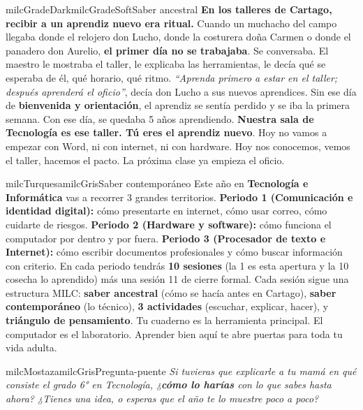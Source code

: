\documentclass[11pt,letterpaper]{article}
\begin{document}
\begin{softbox}{milcGradeDark}{milcGradeSoft}{Saber ancestral}
\textbf{En los talleres de Cartago, recibir a un aprendiz nuevo era ritual.} Cuando un muchacho del campo llegaba donde el relojero don Lucho, donde la costurera doña Carmen o donde el panadero don Aurelio, \textbf{el primer día no se trabajaba}. Se conversaba. El maestro le mostraba el taller, le explicaba las herramientas, le decía qué se esperaba de él, qué horario, qué ritmo. \emph{``Aprenda primero a estar en el taller; después aprenderá el oficio''}, decía don Lucho a sus nuevos aprendices. Sin ese día de \textbf{bienvenida y orientación}, el aprendiz se sentía perdido y se iba la primera semana. Con ese día, se quedaba 5 años aprendiendo. \textbf{Nuestra sala de Tecnología es ese taller. Tú eres el aprendiz nuevo}. Hoy no vamos a empezar con Word, ni con internet, ni con hardware. Hoy nos conocemos, vemos el taller, hacemos el pacto. La próxima clase ya empieza el oficio.
\end{softbox}

\begin{softbox}{milcTurquesa}{milcGris}{Saber contemporáneo}
Este año en \textbf{Tecnología e Informática} vas a recorrer 3 grandes territorios. \textbf{Periodo 1 (Comunicación e identidad digital):} cómo presentarte en internet, cómo usar correo, cómo cuidarte de riesgos. \textbf{Periodo 2 (Hardware y software):} cómo funciona el computador por dentro y por fuera. \textbf{Periodo 3 (Procesador de texto e Internet):} cómo escribir documentos profesionales y cómo buscar información con criterio. En cada periodo tendrás \textbf{10 sesiones} (la 1 es esta apertura y la 10 cosecha lo aprendido) más una sesión 11 de cierre formal. Cada sesión sigue una estructura MILC: \textbf{saber ancestral} (cómo se hacía antes en Cartago), \textbf{saber contemporáneo} (lo técnico), \textbf{3 actividades} (escuchar, explicar, hacer), y \textbf{triángulo de pensamiento}. Tu cuaderno es la herramienta principal. El computador es el laboratorio. Aprender bien aquí te abre puertas para toda tu vida adulta.
\end{softbox}

\begin{softbox}{milcMostaza}{milcGris}{Pregunta-puente}
\textit{Si tuvieras que explicarle a tu mamá \emph{en qué consiste el grado 6° en Tecnología}, ¿\textbf{cómo lo harías} con lo que sabes hasta ahora? ¿Tienes una idea, o esperas que el año te lo muestre poco a poco?}
\end{softbox}
\end{document}
